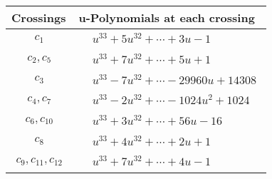 \documentclass[1p]{elsarticle_modified}
\theoremstyle{definition}
\begin{document}
\begin{tabular}{m{50pt}|m{274pt}}
Crossings & \hspace{64pt}u-Polynomials at each crossing \\
\hline $$\begin{aligned}c_{1}\end{aligned}$$&$\begin{aligned}
&u^{33}+5 u^{32}+\cdots+3 u-1
\end{aligned}$\\
\hline $$\begin{aligned}c_{2},c_{5}\end{aligned}$$&$\begin{aligned}
&u^{33}+7 u^{32}+\cdots+5 u+1
\end{aligned}$\\
\hline $$\begin{aligned}c_{3}\end{aligned}$$&$\begin{aligned}
&u^{33}-7 u^{32}+\cdots-29960 u+14308
\end{aligned}$\\
\hline $$\begin{aligned}c_{4},c_{7}\end{aligned}$$&$\begin{aligned}
&u^{33}-2 u^{32}+\cdots-1024 u^2+1024
\end{aligned}$\\
\hline $$\begin{aligned}c_{6},c_{10}\end{aligned}$$&$\begin{aligned}
&u^{33}+3 u^{32}+\cdots+56 u-16
\end{aligned}$\\
\hline $$\begin{aligned}c_{8}\end{aligned}$$&$\begin{aligned}
&u^{33}+4 u^{32}+\cdots+2 u+1
\end{aligned}$\\
\hline $$\begin{aligned}c_{9},c_{11},c_{12}\end{aligned}$$&$\begin{aligned}
&u^{33}+7 u^{32}+\cdots+4 u-1
\end{aligned}$\\
\hline
\end{tabular}\\~\\
\newpage\renewcommand{\arraystretch}{1}
\end{document}
